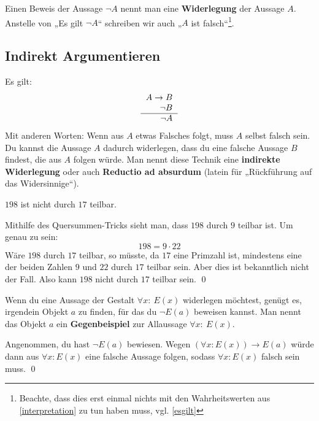 \begin{de}[Widerlegung]
Einen Beweis der Aussage $\neg A$ nennt man eine \textbf{Widerlegung} der Aussage $A$. \\[0.5em]
Anstelle von „Es gilt $\neg A$“ schreiben wir auch „$A$ ist falsch“\footnote{Beachte, dass dies erst einmal nichts mit den Wahrheitswerten aus \cref{interpretation} zu tun haben muss, vgl. \cref{esgilt}}.
\end{de}



\subsection{Indirekt Argumentieren}



\begin{axi} \label{reductio}
 Es gilt:
 \[ \begin{tabular}{r}
     $A\to B$ \\
     $\neg B$ \\ \hline
$\neg A$
     \end{tabular} \]
 Mit anderen Worten: Wenn aus $A$ etwas Falsches folgt, muss $A$ selbst falsch sein. \\
 Du kannst die Aussage $A$ dadurch widerlegen, dass du eine falsche Aussage $B$ findest, die aus $A$ folgen würde. Man nennt diese Technik eine \textbf{indirekte Widerlegung} oder auch \textbf{Reductio ad absurdum} (latein für „Rückführung auf das Widersinnige“).
\end{axi}




\begin{bsp}
$198$ ist nicht durch $17$ teilbar.
\end{bsp}
\begin{bew}
 Mithilfe des Quersummen-Tricks sieht man, dass $198$ durch $9$ teilbar ist. Um genau zu sein:
\[ 198 = 9 \cdot 22 \]
Wäre $198$ durch $17$ teilbar, so müsste, da $17$ eine Primzahl ist, mindestens eine der beiden Zahlen $9$ und $22$ durch $17$ teilbar sein. Aber dies ist bekanntlich nicht der Fall. Also kann $198$ nicht durch $17$ teilbar sein. \qed
\end{bew}




 \begin{sat} \label{gegenbeispiel}
 Wenn du eine Aussage der Gestalt $\forall x:\ E(x)$ widerlegen möchtest, genügt es, irgendein Objekt $a$ zu finden, für das du $\neg E(a)$ beweisen kannst. Man nennt das Objekt $a$ ein \textbf{Gegenbeispiel} zur Allaussage $\forall x:\ E(x)$.
 \end{sat}
 \begin{bew}
Angenommen, du hast $\neg E(a)$ bewiesen. Wegen $(\forall x: E(x)) \to E(a)$ würde dann aus $\forall x:E(x)$ eine falsche Aussage folgen, sodass $\forall x:E(x)$ falsch sein muss. \qed
 \end{bew}

